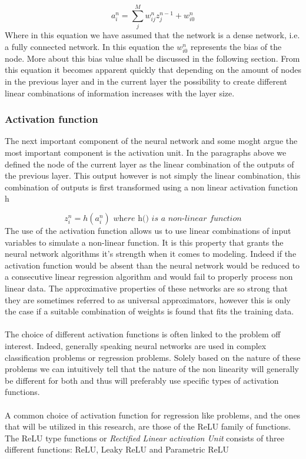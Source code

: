 \documentclass[]{article}
\begin{document}
\begin{equation}
	a^{n}_{i} = \sum_{j}^{M} w_{ij}^{n}z_{j}^{n-1} + w_{i0}^{n}
\end{equation}
Where in this equation we have assumed that the network is a dense network, i.e. a fully connected network. In this equation the $w_{i0}^{n}$ represents the bias of the node. More about this bias value shall be discussed in the following section.  From this equation it becomes apparent quickly that depending on the amount of nodes in the previous layer and in the current layer the possibility to create different linear combinations of information increases with the layer size.

\subsubsection{Activation function}

The next important component of the neural network and some moght argue the most important component is the activation unit. In the paragraphs above we defined the node of the current layer as the linear combination of the outputs of the previous layer. This output however is not simply the linear combination, this combination of outputs is first transformed using a non linear activation function h

\begin{equation}
	z_{i}^{n} = h(a^{n}_{i}) \textit{ where h() is a non-linear function}
\end{equation} 
The use of the activation function allows us to use linear combinations of input variables to simulate a non-linear function. It is this property that grants the neural network algorithms it's strength when it comes to modeling. Indeed if the activation function would be absent than the neural network would be reduced to a consecutive linear regression algorithm and would fail to properly process non linear data.  The approximative properties of these networks are so strong that they are sometimes referred to as universal approximators, however this is only the case if a suitable combination of weights is found that fits the training data.
\\
\\
The choice of different activation functions is often linked to the problem off interest. Indeed, generally speaking neural networks are used in complex classification problems or regression problems. Solely based on the nature of these problems we can intuitively tell that the nature of the non linearity will generally be different for both and thus will preferably use specific types of activation functions.
\\
\\  
A common choice of activation function for regression like problems, and the ones that will be utilized in this research, are those of the ReLU family of functions. The ReLU type functions or \textit{Rectified Linear activation Unit} consists of three different functions: ReLU, Leaky ReLU and Parametric ReLU
\end{document}
